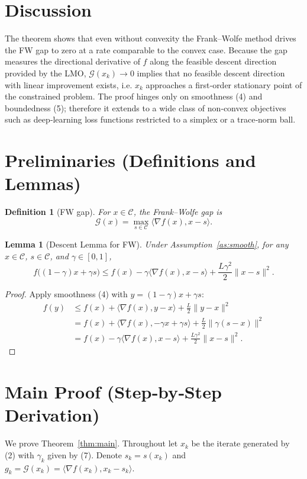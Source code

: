 \documentclass{article}
\newtheorem{lemma}{Lemma}
\newtheorem{definition}{Definition}
\newcommand{\gap}{\mathcal{G}}
\begin{document}
\section*{Discussion}
The theorem shows that even without convexity the Frank–Wolfe method drives the FW gap to zero at a rate comparable to the convex case.  Because the gap measures the directional derivative of $f$ along the feasible descent direction provided by the LMO, $\gap(x_{k})\to0$ implies that no feasible descent direction with linear improvement exists, i.e. $x_{k}$ approaches a first‑order stationary point of the constrained problem.  The proof hinges only on smoothness (4) and boundedness (5); therefore it extends to a wide class of non‑convex objectives such as deep‑learning loss functions restricted to a simplex or a trace‑norm ball.

\section*{Preliminaries (Definitions and Lemmas)}
\begin{definition}[FW gap]\label{def:gap}
For $x\in\mathcal C$, the Frank–Wolfe gap is
\[
\gap(x)=\max_{s\in\mathcal C}\langle\nabla f(x),x-s\rangle .
\]
\end{definition}

\begin{lemma}[Descent Lemma for FW]\label{lem:descent}
Under Assumption~\ref{as:smooth}, for any $x\in\mathcal C$, $s\in\mathcal C$, and $\gamma\in[0,1]$,
\[
f\bigl((1-\gamma)x+\gamma s\bigr)
\le f(x)-\gamma\langle\nabla f(x),x-s\rangle
     +\frac{L\gamma^{2}}{2}\|x-s\|^{2}.
\tag{10}
\]
\end{lemma}
\begin{proof}
Apply smoothness (4) with $y=(1-\gamma)x+\gamma s$:
\[
\begin{aligned}
f(y)
&\le f(x)+\langle\nabla f(x),y-x\rangle+\frac{L}{2}\|y-x\|^{2}\\
&= f(x)+\langle\nabla f(x),-\gamma x+\gamma s\rangle+\frac{L}{2}\|\gamma(s-x)\|^{2}\\
&= f(x)-\gamma\langle\nabla f(x),x-s\rangle+\frac{L\gamma^{2}}{2}\|x-s\|^{2}.
\end{aligned}
\]
\end{proof}

\section*{Main Proof (Step‑by‑Step Derivation)}
We prove Theorem~\ref{thm:main}.  Throughout let $x_{k}$ be the iterate generated by (2) with $\gamma_{k}$ given by (7).  Denote $s_{k}=s(x_{k})$ and $g_{k}= \gap(x_{k})=\langle\nabla f(x_{k}),x_{k}-s_{k}\rangle$.
\end{document}
